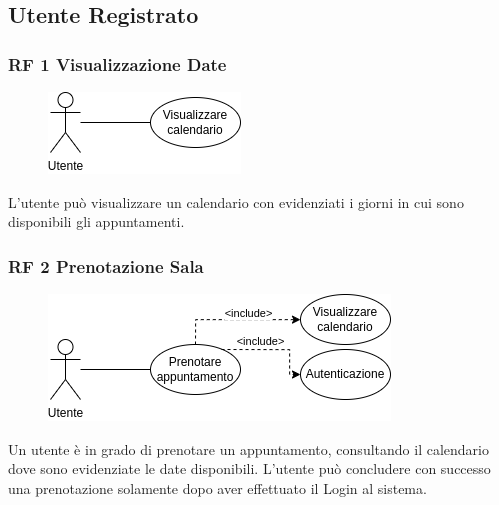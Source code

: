 \documentclass{article}
\begin{document}
\subsection{Utente Registrato}

\subsubsection{RF 1 Visualizzazione Date}\label{rf_1}
\begin{description}
	    
	\begin{figure}[htp]
		\centering
		\includegraphics[]{rf1.png}
	\end{figure}
	    
	\item L'utente può visualizzare un calendario con evidenziati i giorni in cui sono disponibili gli appuntamenti. 
\end{description}

\subsubsection{RF 2 Prenotazione Sala}\label{rf_2}
\begin{description}
	
	\begin{figure}[htp]
		\centering
		\includegraphics[]{rf2.png}
	\end{figure}
		
	\item Un utente è in grado di prenotare un appuntamento, consultando il calendario dove sono evidenziate le date disponibili. L'utente può concludere con successo una prenotazione solamente dopo aver effettuato il Login al sistema.   	
\end{description}

\clearpage
\end{document}
